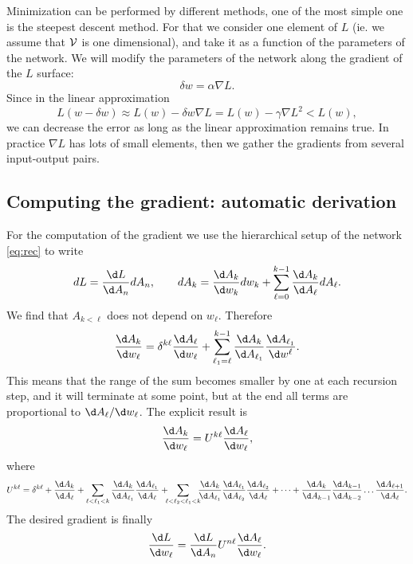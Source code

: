 \documentclass{article}
\begin{document}
Minimization can be performed by different methods, one of the most
simple one is the steepest descent method. For that we consider one
element of $L$ (ie. we assume that ${\cal V}$ is one dimensional), and
take it as a function of the parameters of the network. We will modify
the parameters of the network along the gradient of the $L$ surface:
\begin{equation}
  \delta w = \alpha \nabla L.
\end{equation}
Since in the linear approximation
\begin{equation}
  L(w -\delta w) \approx L(w) -\delta w \nabla L = L(w) - \gamma
  \nabla L^2 <L(w),
\end{equation}
we can decrease the error as long as the linear approximation remains
true. In practice $\nabla L$ has lots of small elements, then we
gather the gradients from several input-output pairs. 

\subsection{Computing the gradient: automatic derivation}

For the computation of the gradient we use the hierarchical setup of
the network \eqref{eq:rec} to write
\begin{equation}
  dL = \frac{\d L}{\d A_n} dA_n,\qquad dA_k = \frac{\d A_k}{\d w_k} d
  w_k + \sum\limits_{\ell=0}^{k-1} \frac{\d A_k}{\d A_\ell} d A_\ell.
\end{equation}
We find that $A_{k<\ell}$ does not depend on $w_\ell$. Therefore
\begin{equation}
  \frac{\d A_k}{\d w_\ell}= \delta^{k\ell} \frac{\d A_\ell}{\d w_\ell} +
  \sum\limits_{\ell_1=\ell}^{k-1} \frac{\d A_k}{\d A_{\ell_1}}
  \frac{\d A_{\ell_1}}{\d w^\ell}.
\end{equation}
This means that the range of the sum becomes smaller by one at each
recursion step, and it will terminate at some point, but at the end
all terms are proportional to ${\d A_\ell}/{\d w_\ell}$. The explicit
result is
\begin{equation}
  \frac{\d A_k}{\d w_\ell} = U^{k\ell} \frac{\d A_\ell}{\d w_\ell},
\end{equation}
where
\begin{equation}
  U^{k\ell} = \delta^{k\ell}+ \frac{\d A_k}{\d A_{\ell}}
  + \sum\limits_{\ell<\ell_1<k} \frac{\d A_k}{\d A_{\ell_1}} \frac{\d
    A_{\ell_1}}{\d A_{\ell}} +\!\!\!
  \sum\limits_{\ell<\ell_2<\ell_1<k}\!\!\!\frac{\d A_k}{\d A_{\ell_1}} \frac{\d
    A_{\ell_1}}{\d A_{\ell_2}} \frac{\d A_{\ell_2}}{\d A_{\ell}}+
  \dots + \frac{\d A_k}{\d A_{k-1}}\frac{\d A_{k-1}}{\d A_{k-2}}\dots 
  \frac{\d A_{\ell+1}}{\d A_{\ell}}.
\end{equation}
The desired gradient is finally
\begin{equation}
  \frac{\d L}{\d w_\ell} = \frac{\d L}{\d A_n} U^{n\ell} \frac{\d
    A_\ell}{\d w_\ell}.
\end{equation}
\end{document}
